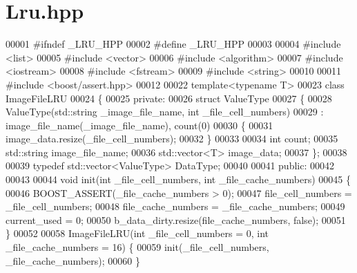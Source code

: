 \section{Lru.\-hpp}
\label{_lru_8hpp}

\begin{DoxyCode}
00001 \textcolor{preprocessor}{#ifndef \_LRU\_HPP}
00002 \textcolor{preprocessor}{}\textcolor{preprocessor}{#define \_LRU\_HPP }
00003 \textcolor{preprocessor}{}
00004 \textcolor{preprocessor}{#include <list>}
00005 \textcolor{preprocessor}{#include <vector>}
00006 \textcolor{preprocessor}{#include <algorithm>}
00007 \textcolor{preprocessor}{#include <iostream>}
00008 \textcolor{preprocessor}{#include <fstream>}
00009 \textcolor{preprocessor}{#include <string>}
00010 
00011 \textcolor{preprocessor}{#include <boost/assert.hpp>}
00012 
00022 \textcolor{keyword}{template}<\textcolor{keyword}{typename} T>
00023 \textcolor{keyword}{class }ImageFileLRU
00024 \{
00025 \textcolor{keyword}{private}:
00026         \textcolor{keyword}{struct }ValueType
00027         \{
00028                 ValueType(std::string \_image\_file\_name, \textcolor{keywordtype}{int} \_file\_cell\_numbers)
00029                         : image\_file\_name(\_image\_file\_name), count(0)
00030                 \{
00031                         image\_data.resize(\_file\_cell\_numbers);
00032                 \}
00033 
00034                 \textcolor{keywordtype}{int} count;
00035                 std::string image\_file\_name;
00036                 std::vector<T> image\_data;
00037         \};
00038 
00039         \textcolor{keyword}{typedef} std::vector<ValueType> DataType;
00040 
00041 \textcolor{keyword}{public}:
00042 
00043 
00044         \textcolor{keywordtype}{void} init(\textcolor{keywordtype}{int} \_file\_cell\_numbers, \textcolor{keywordtype}{int} \_file\_cache\_numbers)
00045         \{
00046                 BOOST\_ASSERT(\_file\_cache\_numbers > 0);
00047                 file\_cell\_numbers = \_file\_cell\_numbers;
00048                 file\_cache\_numbers = \_file\_cache\_numbers;
00049                 current\_used = 0;
00050                 b\_data\_dirty.resize(file\_cache\_numbers, \textcolor{keyword}{false});
00051         \}
00052 
00058         ImageFileLRU(\textcolor{keywordtype}{int} \_file\_cell\_numbers = 0, \textcolor{keywordtype}{int} \_file\_cache\_numbers = 16) 
      \{
00059                 init(\_file\_cell\_numbers, \_file\_cache\_numbers);
00060         \}

\end{DoxyCode}
